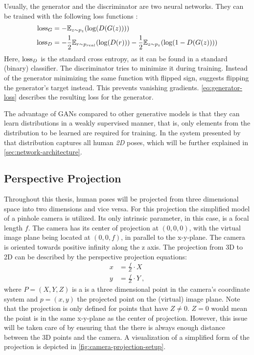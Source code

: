 Usually, the generator and the discriminator are two neural networks.
They can be trained with the following loss functions \cite{goodfellow17}:
\begin{align}
\label{eq:generator-loss}
\operatorname{loss}_G &= -\mathbb{E}_{z\sim p_{z}}(\log(D(G(z)))) \\
\label{eq:discriminator-loss}
\operatorname{loss}_D &= -\frac{1}{2}\mathbb{E}_{r\sim p_{real}}(\log(D(r))) - \frac{1}{2} \mathbb{E}_{z\sim p_{z}}(\log(1 - D(G(z))))
\end{align}
Here, $\operatorname{loss}_D$ is the standard cross entropy, as it can be found in a standard (binary) classifier.
The discriminator tries to minimize it during training.
Instead of the generator minimizing the same function with flipped sign, \citet{goodfellow17} suggests flipping the generator's target instead.
This prevents vanishing gradients.
\autoref{eq:generator-loss} describes the resulting loss for the generator.

The advantage of GANs compared to other generative models is that they can learn distributions in a weakly supervised manner, that is, only elements from the distribution to be learned are required for training.
In the system presented by \citet{drover18} that distribution captures all human \emph{2D} poses, which will be further explained in \autoref{sec:network-architecture}.

\subsection{Perspective Projection}



Throughout this thesis, human poses will be projected from three dimensional space into two dimensions and vice versa.
For this projection the simplified model of a pinhole camera is utilized. 
Its only intrinsic parameter, in this case, is a focal length $f$.
The camera has its center of projection at $(0, 0, 0)$, with the virtual image plane being located at $(0, 0, f)$, in parallel to the x-y-plane.
The camera is oriented towards positive infinity along the z axis.
The projection from 3D to 2D can be described by the perspective projection equations:
\begin{align}
	\label{eq:perspective-projection}
	x &= \frac{f}{Z} \cdot X\\
	y &= \frac{f}{Z} \cdot Y \ ,
\end{align}
where $P = (X, Y, Z)$ is a is a three dimensional point in the camera's coordinate system and $p = (x, y)$ the projected point on the (virtual) image plane.
Note that the projection is only defined for points that have $Z \neq 0$.
$Z = 0$ would mean the point is in the same x-y-plane as the center of projection.
However, this issue will be taken care of by ensuring that the there is always enough distance between the 3D points and the camera.
A visualization of a simplified form of the projection is depicted in \autoref{fig:camera-projection-setup}.

